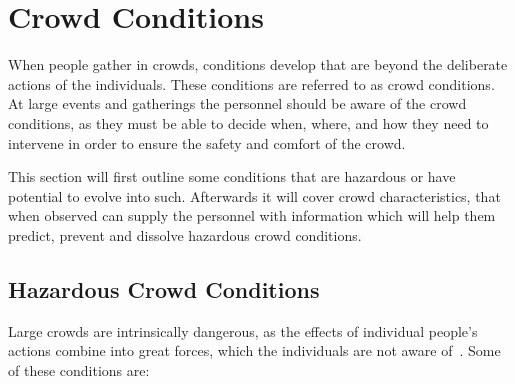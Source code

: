 \section{Crowd Conditions}\label{sec:related_work}

When people gather in crowds, conditions develop that are beyond the deliberate actions of the individuals. These conditions are referred to as crowd conditions. At large events and gatherings the personnel should be aware of the crowd conditions, as they must be able to decide when, where, and how they need to intervene in order to ensure the safety and comfort of the crowd.

This section will first outline some conditions that are hazardous or have potential to evolve into such. Afterwards it will cover crowd characteristics, that when observed can supply the personnel with information which will help them predict, prevent and dissolve hazardous crowd conditions.

\subsection{Hazardous Crowd Conditions}
Large crowds are intrinsically dangerous, as the effects of individual people's actions combine into great forces, which the individuals are not aware of~\cite{website:Wikipedia-Hajj}. Some of these conditions are:

